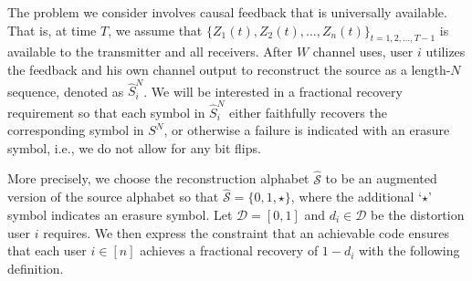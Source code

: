 
The problem we consider involves causal feedback  that is universally available.  That is, at time $T$, we assume that $\{Z_1(t), Z_2(t), \ldots,  Z_n(t)\}_{t=1, 2, \ldots, T-1}$ is available to the transmitter and all receivers. 
After $W$ channel uses, user $i$ utilizes the feedback and his own channel output to reconstruct the source as a length-$N$ sequence, denoted as $\hat{S}_{i}^{N}$.  We will be interested in a fractional recovery requirement so that each symbol in $\hat{S}_{i}^{N}$ either faithfully recovers the corresponding symbol in $S^{N}$, or otherwise a failure is indicated with an erasure symbol, i.e., we do not allow for any bit flips.

More precisely, we choose the reconstruction alphabet $\mathcal{\hat{S}}$ to be an augmented version of the source alphabet so that $\mathcal{\hat{S}} = \{0, 1, \star\}$, where the additional `$\star$' symbol indicates an erasure symbol.  Let $\mathcal{D} = [0,1]$ and $d_i \in \mathcal{D}$ be the distortion user $i$ requires.  We then express the constraint that an achievable code ensures that each user $i \in [n]$ achieves a fractional recovery of $1 - d_{i}$ with the following definition.




